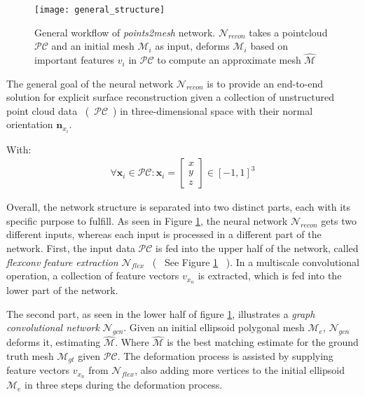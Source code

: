 \begin{figure}
   \begin{center}
   \texttt{[image: general\_structure]}
   \caption{General workflow of \emph{points2mesh} network. $\mathcal{N}_{recon}$ takes a pointcloud $\mathcal{PC}$ and an initial mesh $\mathcal{M}_i$
   as input, deforms $\mathcal{M}_i$ based on important features $v_i$ in $\mathcal{PC}$ to compute an approximate mesh $\hat{\mathcal{M}}$}
   \label{fig:generalconfig}
   \end{center}
 \end{figure}
 The general goal of the neural network $\mathcal{N}_{recon}$ is to provide an end-to-end solution for 
 explicit surface reconstruction given a collection of unstructured point cloud data ~(~$\mathcal{PC}$~) in three-dimensional 
 space with their normal orientation $\textbf{n}_{x_i}$. 

 With:
 \begin{align}
      \forall \textbf{x}_i \in \mathcal{PC} : 
      \textbf{x}_i =
      \begin{bmatrix}
            x \\
            y\\
            z
          \end{bmatrix} \in [-1,1]^3
   \end{align}

 Overall, the network structure is separated into two distinct parts,
  each with its specific purpose to fulfill. As seen in Figure \ref{fig:generalconfig}, the neural 
  network $\mathcal{N}_{recon}$ gets two different inputs, whereas each input is processed in a different part of the network.
 First, the input data $\mathcal{PC}$ is fed into the upper half of the network, called \emph{flexconv feature extraction}
  $\mathcal{N}_{flex}$ ~(~ See Figure \ref{fig:generalconfig} ~). In a multiscale convolutional operation,
   a collection of feature vectors $v_{x_n}$ is extracted, 
which is fed into the lower part of the network.

  The second part, as seen in the lower half of figure \ref{fig:generalconfig}, illustrates 
  a \emph{graph convolutional network} $\mathcal{N}_{gcn}$. Given an initial ellipsoid
  polygonal mesh $\mathcal{M}_{e}$, $\mathcal{N}_{gcn}$ deforms it, estimating $\hat{\mathcal{M}}$.
   Where $\hat{\mathcal{M}}$ is the best matching estimate for the ground truth mesh $\mathcal{M}_{gt}$ given $\mathcal{PC}$.
   The deformation process is assisted by supplying feature vectors $v_{x_n}$ from $\mathcal{N}_{flex}$, also adding more
    vertices to the initial ellipsoid $\mathcal{M}_{e}$ in three steps during the deformation process.
